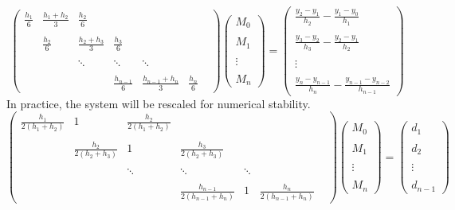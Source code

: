\begin{equation}
    \begin{pmatrix}
        \frac{h_1}{6} & \frac{h_1 + h_{2}}{3} & \frac{h_{2}}{6} & \\\\
        &\frac{h_2}{6} & \frac{h_2 + h_{3}}{3} & \frac{h_{3}}{6} & \\\\
        &&\ddots &  \ddots & \ddots & \\ \\
        &&& \frac{h_{n-1}}{6} & \frac{h_{n-1} + h_{n}}{3} & \frac{h_{n}}{6} &
    \end{pmatrix} \begin{pmatrix}
        M_0 \\\\M_1\\\\ \vdots\\\\ M_n
    \end{pmatrix} 
    = \begin{pmatrix}
        \frac{y_{2} - y_{1}}{h_{2}} - \frac{y_{1} - y_{0}}{h_1} \\\\
        \frac{y_{3} - y_{2}}{h_{3}} - \frac{y_{2} - y_{1}}{h_2} \\\\
        \vdots \\\\
        \frac{y_{n} - y_{n-1}}{h_{n}} - \frac{y_{n-1} - y_{n-2}}{h_{n-1}} 
    \end{pmatrix}
\end{equation}
In practice, the system will be rescaled for numerical stability. 
\begin{equation}\nonumber
    \begin{pmatrix}
        \frac{h_1}{2(h_1 + h_{2})} & 1 & \frac{h_{2}}{2(h_1 + h_{2})} & \\\\
        &\frac{h_2}{2(h_2 + h_{3})} & 1 & \frac{h_{3}}{2(h_2 + h_{3})} & \\\\
        &&\ddots &  \ddots & \ddots & \\ \\
        &&& \frac{h_{n-1}}{2(h_{n-1} + h_{n})} & 1 & \frac{h_{n}}{2(h_{n-1} + h_{n})} &
    \end{pmatrix} \begin{pmatrix}
        M_0 \\\\M_1\\\\ \vdots\\\\ M_n
    \end{pmatrix} 
    = \begin{pmatrix}
       d_1 \\\\
        d_2 \\\\
        \vdots \\\\
       d_{n-1}
    \end{pmatrix}
\end{equation}
